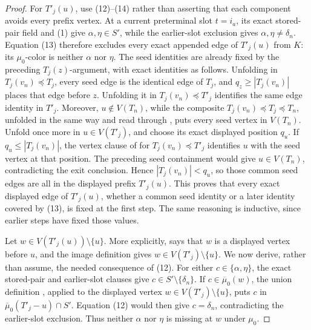 \begin{proof}
For \(T'_j(u)\), use (12)--(14) rather than asserting that each component
avoids every prefix vertex.  At a current preterminal slot \(t=i_a\), its
exact stored-pair field and (1) give
\(\alpha,\eta\in S'\), while the earlier-slot exclusion gives
\(\alpha,\eta\ne\delta_n\).  Equation (13) therefore excludes every exact
appended edge of \(T'_j(u)\) from \(K\): its \(\mu_0\)-color is neither
\(\alpha\) nor \(\eta\).  The seed identities are already fixed by the
preceding \(T_j(z)\)-argument, with exact identities as follows.  Unfolding
 in
\(T_j(v_n)\preccurlyeq T_j\), every seed edge is the identical edge of
\(T_j\), and \(q_z\ge |T_j(v_n)|\) places that edge before \(z\).
Unfolding it in \(T_j(v_n)\preccurlyeq T'_j\) identifies the same edge
identity in \(T'_j\).  Moreover, \(u\notin V(T_n)\), while the composite
\(T_j(v_n)\preccurlyeq T_j\preccurlyeq T_n\), unfolded in the same way and
read through , puts every seed vertex in
\(V(T_n)\).  Unfold  once more in
\(u\in V(T'_j)\), and choose its exact displayed position \(q_u\).  If
\(q_u\le |T_j(v_n)|\), the vertex clause of
 for
\(T_j(v_n)\preccurlyeq T'_j\) identifies \(u\) with the seed vertex at
that position.  The preceding seed containment would give
\(u\in V(T_n)\), contradicting the exit conclusion.  Hence
\(|T_j(v_n)|<q_u\), so those common seed edges are all in the displayed
prefix \(T'_j(u)\).  This proves that every exact displayed edge of
\(T'_j(u)\), whether a common seed identity or a later identity covered by
(13), is fixed at the first step.  The same reasoning is inductive, since
earlier steps have fixed those values.

Let \(w\in V(T'_j(u))\setminus\{u\}\).  More explicitly,
 says that \(w\) is a displayed vertex before
\(u\), and the image definition  gives
\(w\in V(T'_j)\setminus\{u\}\).  We now derive, rather than assume, the
needed consequence of (12).  For either
\(c\in\{\alpha,\eta\}\), the exact stored-pair and earlier-slot clauses
give \(c\in S'\setminus\{\delta_n\}\).  If
\(c\in\overline\mu_0(w)\), the union definition
, applied to the displayed vertex
\(w\in V(T'_j)\setminus\{u\}\), puts \(c\) in
\(\overline\mu_0(T'_j-u)\cap S'\).  Equation (12) would then give
\(c=\delta_n\), contradicting the earlier-slot exclusion.  Thus neither
\(\alpha\) nor \(\eta\) is missing at \(w\) under \(\mu_0\).


\end{proof}
